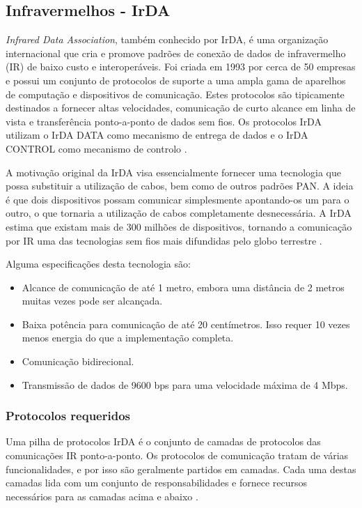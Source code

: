 \documentclass[conference]{IEEEtran}
\begin{document}
\subsection{Infravermelhos - IrDA}

\textit{Infrared Data Association}, também conhecido por IrDA, é uma organização internacional que cria e promove padrões de conexão de dados de infravermelho (IR) de baixo custo e interoperáveis.
Foi criada em 1993 por cerca de 50 empresas e possui um conjunto de protocolos de suporte a uma ampla gama de aparelhos de computação e dispositivos de comunicação. 
Estes protocolos são tipicamente destinados a fornecer altas velocidades, comunicação de curto alcance em linha de vista e transferência ponto-a-ponto de dados sem fios. 
Os protocolos IrDA utilizam o IrDA DATA como mecanismo de entrega de dados e o IrDA CONTROL como mecanismo de controlo \cite{infareddd}.

A motivação original da IrDA visa essencialmente fornecer uma tecnologia que possa substituir a utilização de cabos, bem como de outros padrões PAN. 
A ideia é que dois dispositivos possam comunicar simplesmente apontando-os um para o outro, o que tornaria a utilização de cabos completamente desnecessária. 
A IrDA estima que existam mais de 300 milhões de dispositivos, tornando a comunicação por IR uma das tecnologias sem fios mais difundidas pelo globo terrestre \cite{wpanonline}.

Alguma especificações desta tecnologia são:

\begin{itemize}

 \item Alcance de comunicação de até 1 metro, embora uma distância de 2 metros muitas vezes pode ser alcançada.
 \item Baixa potência para comunicação de até 20 centímetros. Isso requer 10 vezes menos energia do que a implementação completa.
 \item Comunicação bidirecional.
 \item Transmissão de dados de 9600 bps para uma velocidade máxima de 4 Mbps.

\end{itemize}

\subsubsection{Protocolos requeridos}

Uma pilha de protocolos IrDA é o conjunto de camadas de protocolos das comunicações IR ponto-a-ponto. 
Os protocolos de comunicação tratam de várias funcionalidades, e por isso são geralmente partidos em camadas. 
Cada uma destas camadas lida com um conjunto de responsabilidades e fornece recursos necessários para as camadas acima e abaixo \cite{megowan1996irda}.
\end{document}
